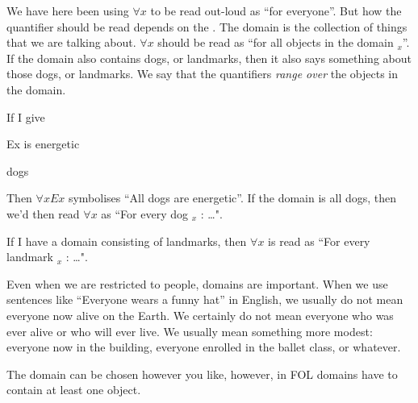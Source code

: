 We have here been using $\forall x$ to be read out-loud as ``for everyone''. 
But how the quantifier should be read depends on the . The domain is the collection of things that we are talking about. $\forall x$ should be read as ``for all objects in the domain $_x$''. If the domain also contains dogs, or landmarks, then it also says something about those dogs, or landmarks. We say that the quantifiers \emph{range over} the objects in the domain. 

If I give 
\begin{ekey}
\item[Ex] is energetic
\item[\text{domain}] dogs
\end{ekey}
Then $\forall x Ex$ symbolises ``All dogs are energetic''. If the domain is all dogs, then we'd then read $\forall x$ as ``For every dog $_x$ : \ldots". 

If I have a domain consisting of landmarks, then $\forall x$ is read as ``For every landmark $_x$ : \ldots". 

Even when we are restricted to people, domains are important. 
When we use sentences like ``Everyone wears a funny hat'' in English, we usually do not mean everyone now alive on the Earth. We certainly do not mean everyone who was ever alive or who will ever live. We usually mean something more modest: everyone now in the building, everyone enrolled in the ballet class, or whatever.



The domain can be chosen however you like, however, in FOL domains have to contain at least one object. 

